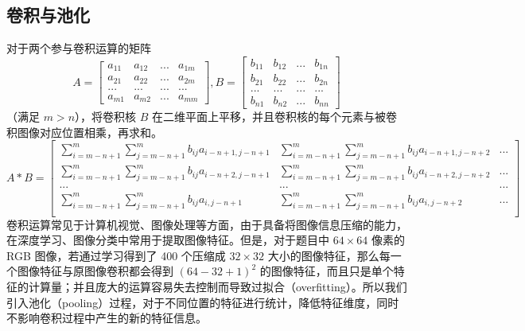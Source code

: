 \documentclass[UTF8]{ctexart}
\begin{document}
\subsection{卷积与池化}
对于两个参与卷积运算的矩阵
$$
A = 
\left[
\begin{matrix}
a_{11} & a_{12} & ... & a_{1m} \\
a_{21} & a_{22} & ... & a_{2m} \\
... & ... & ... & ... \\
a_{m1} & a_{m2} & ... & a_{mm}
\end{matrix}
\right]
, B = 
\left[
\begin{matrix}
b_{11} & b_{12} & ... & b_{1n} \\
b_{21} & b_{22} & ... & b_{2n} \\
... & ... & ... & ... \\
b_{n1} & b_{n2} & ... & b_{nn}
\end{matrix}
\right]
$$
（满足 $m > n$），将卷积核 $B$ 在二维平面上平移，并且卷积核的每个元素与被卷积图像对应位置相乘，再求和。
$$
A * B = 
\left[
\begin{matrix}
\sum_{i = m - n + 1}^{m}\sum_{j = m - n + 1}^{m}b_{ij}a_{i-n+1, j-n+1} & \sum_{i = m - n + 1}^{m}\sum_{j = m - n + 1}^{m}b_{ij}a_{i-n+1, j-n+2} & ... \\ %
\sum_{i = m - n + 1}^{m}\sum_{j = m - n + 1}^{m}b_{ij}a_{i-n+2, j-n+1} & \sum_{i = m - n + 1}^{m}\sum_{j = m - n + 1}^{m}b_{ij}a_{i-n+2, j-n+2} & ...  \\ %
... & ... & ... \\
\sum_{i = m - n + 1}^{m}\sum_{j = m - n + 1}^{m}b_{ij}a_{i, j-n+1} & \sum_{i = m - n + 1}^{m}\sum_{j = m - n + 1}^{m}b_{ij}a_{i, j-n+2} & ... \\ %
\end{matrix}
\right]
$$
卷积运算常见于计算机视觉、图像处理等方面，由于具备将图像信息压缩的能力，在深度学习、图像分类中常用于提取图像特征。但是，对于题目中 $64 \times 64$ 像素的 RGB 图像，若通过学习得到了 400 个压缩成 $32 \times 32$ 大小的图像特征，那么每一个图像特征与原图像卷积都会得到 $(64 - 32 + 1)^2$ 的图像特征，而且只是单个特征的计算量；并且庞大的运算容易失去控制而导致过拟合（overfitting）。所以我们引入池化（pooling）过程，对于不同位置的特征进行统计，降低特征维度，同时不影响卷积过程中产生的新的特征信息。
\end{document}
